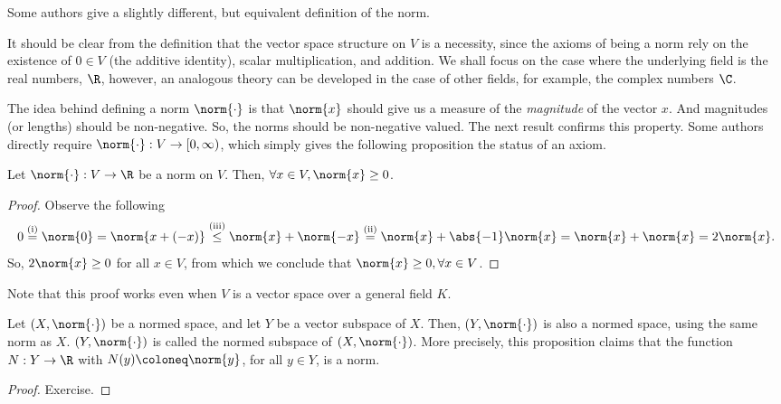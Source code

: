 \documentclass[draft]{penrose}
\begin{document}
Some authors give a slightly different, but equivalent definition of the norm.

It should be clear from the definition that the vector space structure on $V$ is a necessity, since the axioms of being a norm rely on the existence of $0 \in V$ (the additive identity), scalar multiplication, and addition. We shall focus on the case where the underlying field is the real numbers, $\R$, however, an analogous theory can be developed in the case of other fields, for example, the complex numbers $\C$.

The idea behind defining a norm $\norm{\cdot}$ is that $\norm{x}$ should give us a measure of the \emph{magnitude} of the vector $x$. And magnitudes (or lengths) should be non-negative. So, the norms should be non-negative valued. The next result confirms this property. Some authors directly require $\norm{\cdot}:V\to[0,\infty)$, which simply gives the following proposition the status of an axiom.

\begin{nprop}
  Let $\norm{\cdot}:V\to\R$ be a norm on $V$. Then, $\forall x \in V, \norm{x} \geq 0$.
\end{nprop}
\begin{proof}
  Observe the following
  \begin{equation*}
    0
    \overset{\text{(i)}}{=} \norm{0}
    = \norm{x+(-x)}
    \overset{\text{(iii)}}{\leq} \norm{x} + \norm{-x}
    \overset{\text{(ii)}}{=} \norm{x} + \abs{-1}\norm{x}
    = \norm{x} + \norm{x}
    = 2\norm{x}.
  \end{equation*}
  So, $2\norm{x} \geq 0$ for all $x \in V$, from which we conclude that $\norm{x} \geq 0, \forall x \in V$.
\end{proof}

Note that this proof works even when $V$ is a vector space over a general field $K$.

\begin{nprop}
  Let $(X, \norm{\cdot})$ be a normed space, and let $Y$ be a vector subspace of $X$. Then, $(Y, \norm{\cdot})$ is also a normed space, using the same norm as $X$. $(Y, \norm{\cdot})$ is called the normed subspace of $(X, \norm{\cdot})$. More precisely, this proposition claims that the function $N:Y \to \R$ with $N(y) \coloneq \norm{y}$, for all $y \in Y$, is a norm.
\end{nprop}
\begin{proof}
  Exercise.
\end{proof}
\end{document}
